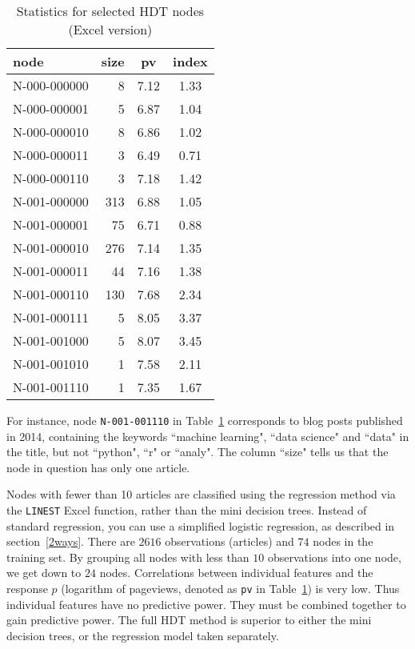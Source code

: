 \documentclass[oneside,10pt]{book}
\renewcommand{\arraystretch}{1.4} %
\begin{document}
\renewcommand{\arraystretch}{1.2} %
\begin{table}%
\begin{center}
\begin{tabular}{lrcc}
\hline
node & size & pv & index \\
\hline
N-000-000000 & 8 & 7.12 & 1.33 \\
N-000-000001 & 5 & 6.87 & 1.04 \\
N-000-000010 & 8 & 6.86 & 1.02 \\
N-000-000011 & 3 & 6.49 & 0.71 \\
N-000-000110 & 3 & 7.18 & 1.42 \\
N-001-000000 & 313 & 6.88 & 1.05 \\
N-001-000001 & 75 & 6.71 & 0.88 \\
N-001-000010 & 276 & 7.14 & 1.35 \\
N-001-000011 & 44 & 7.16 & 1.38 \\
N-001-000110 & 130 & 7.68 & 2.34 \\
N-001-000111 & 5 & 8.05 & 3.37 \\
N-001-001000 & 5 & 8.07 & 3.45 \\
N-001-001010 & 1 & 7.58 & 2.11 \\
N-001-001110 & 1 & 7.35 & 1.67 \\
\hline
\end{tabular}
\caption{\label{fffnode}Statistics for selected HDT nodes (Excel version)}
\end{center}
\end{table}
\renewcommand{\arraystretch}{1.0} %

For instance, node \texttt{N-001-001110} in Table~\ref{fffnode} corresponds to blog posts published in 2014, containing the keywords ``machine learning", ``data science" and ``data" in the title, but not ``python", ``r" or ``analy". The column ``size" tells us that the node in question has only one article.


Nodes with fewer than 10 articles are classified using the regression method via the \texttt{LINEST} Excel function, rather than the mini decision trees. Instead of standard regression, you can use a simplified logistic regression,
 as described in section~\ref{2ways}. There are $\num{2616}$ observations (articles) and $74$ nodes in the training set. By grouping all nodes with less than $10$ observations into one node, we get down to $24$ nodes. Correlations between individual features and the response $p$ (logarithm of pageviews, denoted as
 \texttt{pv} in Table~\ref{fffnode}) is very low. Thus individual features have no predictive power. They must be combined together
 to gain predictive power. The full HDT method is superior to either the mini decision trees, or the regression model taken separately.
\end{document}
